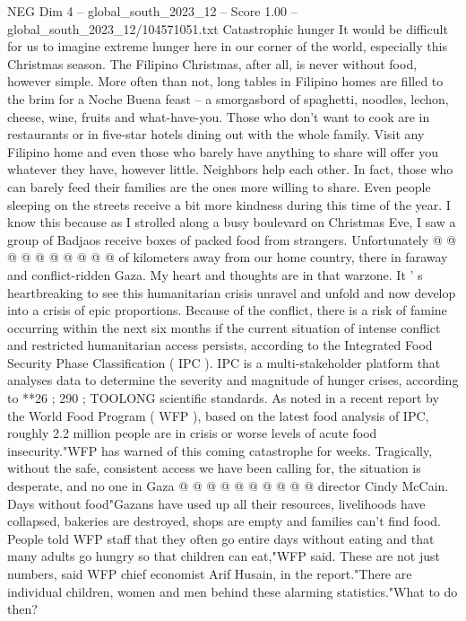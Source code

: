 \begin{textsample}{NEG Dim 4 – global\_south\_2023\_12 – Score 1.00 – global\_south\_2023\_12/104571051.txt}  \label{ex:f4_neg_330}
Catastrophic hunger It would be difficult for us to imagine extreme hunger here in our corner of the world, especially this Christmas season.
The Filipino Christmas, after all, is never without food, however simple.
More often than not, long tables in Filipino homes are filled to the brim for a Noche Buena feast -- a smorgasbord of spaghetti, noodles, lechon, cheese, wine, fruits and what-have-you.
Those who don't want to cook are in restaurants or in five-star hotels dining out with the whole family.
Visit any Filipino home and even those who barely have anything to share will offer you whatever they have, however little.
Neighbors help each other.
In fact, those who can barely feed their families are the ones more willing to share.
Even people sleeping on the streets receive a bit more kindness during this time of the year.
I know this because as I strolled along a busy boulevard on Christmas Eve, I saw a group of Badjaos receive boxes of packed food from strangers.
Unfortunately @ @ @ @ @ @ @ @ @ @ of kilometers away from our home country, there in faraway and conflict-ridden Gaza.
My heart and thoughts are in that warzone.
It ' s heartbreaking to see this humanitarian crisis unravel and unfold and now develop into a crisis of epic proportions.
Because of the conflict, there is a risk of famine occurring within the next six months if the current situation of intense conflict and restricted humanitarian access persists, according to the Integrated Food Security Phase Classification ( IPC ).
IPC is a multi-stakeholder platform that analyses data to determine the severity and magnitude of hunger crises, according to **26 ; 290 ; TOOLONG scientific standards.
As noted in a recent report by the World Food Program ( WFP ), based on the latest food analysis of IPC, roughly 2.2 million people are in crisis or worse levels of acute food insecurity."WFP has warned of this coming catastrophe for weeks.
Tragically, without the safe, consistent access we have been calling for, the situation is desperate, and no one in Gaza @ @ @ @ @ @ @ @ @ @ director Cindy McCain.
Days without food"Gazans have used up all their resources, livelihoods have collapsed, bakeries are destroyed, shops are empty and families can't find food.
People told WFP staff that they often go entire days without eating and that many adults go hungry so that children can eat,"WFP said.
These are not just numbers, said WFP chief economist Arif Husain, in the report."There are individual children, women and men behind these alarming statistics."What to do then?

\end{textsample}
